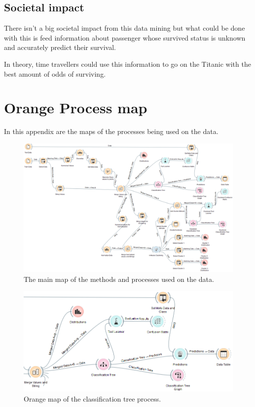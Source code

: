 \documentclass[a4paper,11pt]{article}
\begin{document}
\subsection{Societal impact}
There isn't a big societal impact from this data mining but what could be done with this is feed information about passenger whose survived status is unknown and accurately predict their survival.

In theory, time travellers could use this information to go on the Titanic with the best amount of odds of surviving.


\clearpage
\appendix
\section{Orange Process map}
\label{appenOrange}
In this appendix are the maps of the processes being used on the data.
\begin{figure}[h]
	\centering
	\includegraphics[scale=0.35]{orangeMap}
	\caption{The main map of the methods and processes used on the data.}
	\label{OrangeMap}
\end{figure}


\begin{figure}[h]
\begin{center}
\includegraphics[scale=0.5]{ClassificationTreeOrange}
\end{center}
\caption{Orange map of the classification tree process.}
\label{classTreeMap}
\end{figure}
\clearpage
\end{document}
